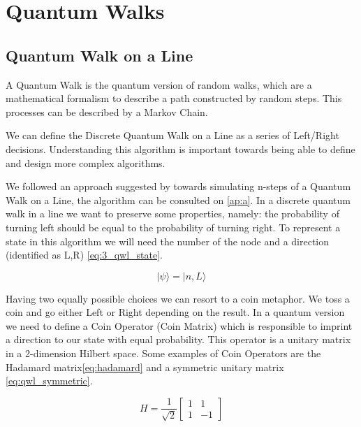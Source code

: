 \section{Quantum Walks}
\label{sec:quantum_walk}

\subsection{Quantum Walk on a Line}
\label{subsec:quantum_walk_line}

A Quantum Walk is the quantum version of random walks, which are a mathematical formalism to describe a path constructed by random steps. This processes can be described by a Markov Chain. 

We can define the Discrete Quantum Walk on a Line as a series of Left/Right decisions. Understanding this algorithm is important towards being able to define and design more complex algorithms.
 
We followed an approach suggested by \cite{Ambainis} towards simulating n-steps of a Quantum Walk on a Line, the algorithm can be consulted on \ref{ap:a}.
In a discrete quantum walk in a line we want to preserve some properties, namely: the probability of turning left should be equal to the probability of turning right.  To represent a state in this algorithm we will need the number of the node and a direction (identified as L,R) \ref{eq:3_qwl_state}.

\begin{equation}
\label{eq:3_qwl_state}
\vert \psi\rangle = \vert n, L\rangle
\end{equation}

Having two equally possible choices we can resort to a coin metaphor\cite{Ambainis}\cite{Ambainis2008}. We toss a coin and go either Left or Right depending on the result. In a quantum version we need to define a Coin Operator (Coin Matrix) which is responsible to imprint a direction to our state with equal probability. This operator is a unitary matrix in a 2-dimension Hilbert space. Some examples of Coin Operators are the Hadamard matrix\ref{eq:hadamard} and a symmetric unitary matrix \ref{eq:qwl_symmetric}.

\begin{equation}
\label{eq:hadamard}
H=\frac{1}{\sqrt{2}}\left[\begin{array}{cc}
1 & 1\\
1 & -1
\end{array}\right]
\end{equation}

